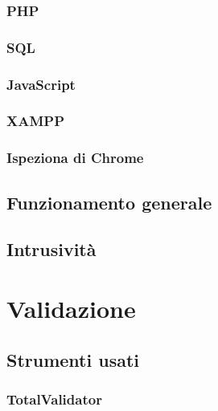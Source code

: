 \documentclass[a4paper]{article}
\begin{document}
			\subsubsection{PHP}
				
			\subsubsection{SQL}
				
			\subsubsection{JavaScript}
				
			\subsubsection{XAMPP}
				
			\subsubsection{Ispeziona di Chrome}
				
		\subsection{Funzionamento generale}
			
		\subsection{Intrusività}
			
		
	\newpage

	\section{Validazione}
		\subsection{Strumenti usati}
			
			\subsubsection{TotalValidator}
				
\end{document}
